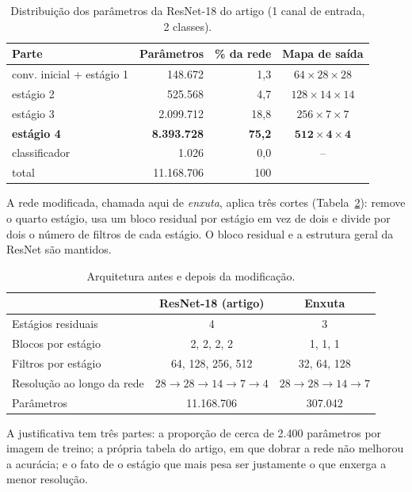 \documentclass[runningheads]{llncs}
\begin{document}
\begin{table}[htbp]
    \centering
    \caption{Distribuição dos parâmetros da ResNet-18 do artigo
    (1 canal de entrada, 2 classes).}
    \label{tab:params}
    \begin{tabular}{lrrc}
        \toprule
        Parte & Parâmetros & \% da rede & Mapa de saída \\
        \midrule
        conv. inicial + estágio 1 & 148.672 & 1,3 & $64\times28\times28$ \\
        estágio 2 & 525.568 & 4,7 & $128\times14\times14$ \\
        estágio 3 & 2.099.712 & 18,8 & $256\times7\times7$ \\
        \textbf{estágio 4} & \textbf{8.393.728} & \textbf{75,2} & $\mathbf{512\times4\times4}$ \\
        classificador & 1.026 & 0,0 & -- \\
        \midrule
        total & 11.168.706 & 100 & \\
        \bottomrule
    \end{tabular}
\end{table}

A rede modificada, chamada aqui de \textit{enxuta}, aplica três cortes
(Tabela~\ref{tab:arq}): remove o quarto estágio, usa um bloco residual por
estágio em vez de dois e divide por dois o número de filtros de cada
estágio. O bloco residual e a estrutura geral da ResNet são mantidos.

\begin{table}[htbp]
    \centering
    \caption{Arquitetura antes e depois da modificação.}
    \label{tab:arq}
    \begin{tabular}{lcc}
        \toprule
        & ResNet-18 (artigo) & Enxuta \\
        \midrule
        Estágios residuais & 4 & 3 \\
        Blocos por estágio & 2, 2, 2, 2 & 1, 1, 1 \\
        Filtros por estágio & 64, 128, 256, 512 & 32, 64, 128 \\
        Resolução ao longo da rede & $28\to28\to14\to7\to4$ & $28\to28\to14\to7$ \\
        Parâmetros & 11.168.706 & 307.042 \\
        \bottomrule
    \end{tabular}
\end{table}

A justificativa tem três partes: a proporção de cerca de 2.400
parâmetros por imagem de treino; a própria tabela do artigo, em que
dobrar a rede não melhorou a acurácia; e o fato de o estágio que mais pesa
ser justamente o que enxerga a menor resolução.
\end{document}
